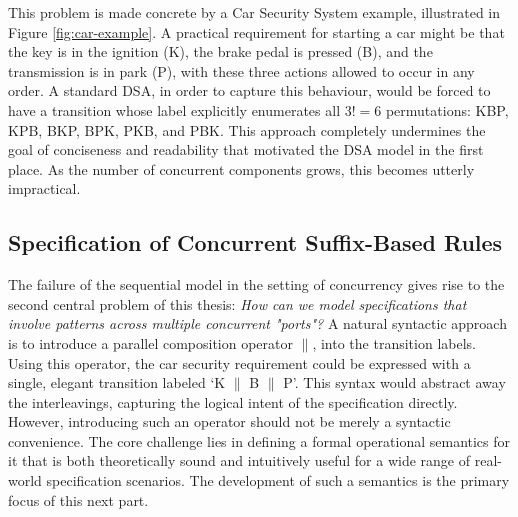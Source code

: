 This problem is made concrete by a Car Security System example, illustrated in Figure \ref{fig:car-example}. A practical requirement for starting a car might be that the key is in the ignition (K), the brake pedal is pressed (B), and the transmission is in park (P), with these three actions allowed to occur in any order. A standard DSA, in order to capture this behaviour, would be forced to have a transition whose label explicitly enumerates all $3! = 6$ permutations: KBP, KPB, BKP, BPK, PKB, and PBK. This approach completely undermines the goal of conciseness and readability that motivated the DSA model in the first place. As the number of concurrent components grows, this becomes utterly impractical.

\subsection*{Specification of Concurrent Suffix-Based Rules}
The failure of the sequential model in the setting of concurrency gives rise to the second central problem of this thesis: \textit{How can we model specifications that involve patterns across multiple concurrent "ports"?} A natural syntactic approach is to introduce a parallel composition operator $\parallel$, into the transition labels. Using this operator, the car security requirement could be expressed with a single, elegant transition labeled `K $\parallel$ B $\parallel$ P'. This syntax would abstract away the interleavings, capturing the logical intent of the specification directly. However, introducing such an operator should not be merely a syntactic convenience. The core challenge lies in defining a formal operational semantics for it that is both theoretically sound and intuitively useful for a wide range of real-world specification scenarios. The development of such a semantics is the primary focus of this next part.

